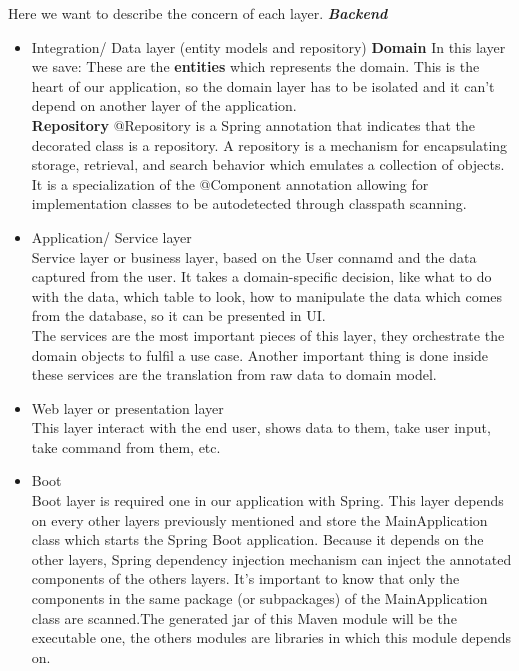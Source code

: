 \documentclass{scrartcl}
\begin{document}
Here we want to describe the concern of each layer.
\textbf{\textit{Backend }}


\begin{itemize}
\item Integration/ Data layer (entity models and repository)
\textbf{Domain}
In this layer we save:
These are the \textbf{entities} which represents the domain. This is the heart of our application, so the domain layer has to be isolated and it can't depend on another layer of the application.\\
\textbf{Repository}
@Repository is a Spring annotation that indicates that the decorated class is a repository. A repository is a mechanism for encapsulating storage, retrieval, and search behavior which emulates a collection of objects. It is a specialization of the @Component annotation allowing for implementation classes to be autodetected through classpath scanning.	
	
\item	Application/ Service layer \\
Service layer or business layer, based on the User connamd and the data captured from the user. It takes a domain-specific decision, like what to do with the data, which table to look, how to manipulate the data which comes from the database, so it can be presented in UI.\\
The services are the most important pieces of this layer, they orchestrate the domain objects to fulfil a use case. Another important thing is done inside these services are the translation from raw data to domain model.\\
\item  Web layer or presentation layer\\
This layer interact with the end user, shows data to them, take user input, take command from them, etc.

\item Boot \\
Boot layer is required one in our application with Spring. This layer depends on every other layers previously mentioned and store the MainApplication class which starts the Spring Boot application. Because it depends on the other layers, Spring dependency injection mechanism can inject the annotated components of the others layers. It’s important to know that only the components in the same package (or subpackages) of the MainApplication class are scanned.The generated jar of this Maven module will be the executable one, the others modules are libraries in which this module depends on.\\


\end{itemize}
\end{document}
